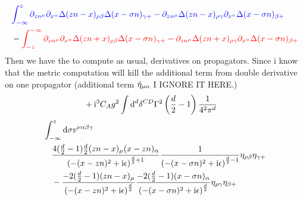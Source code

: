 \begin{align}
	&{\color{blue}\int_{-\infty}^{z}\partial_{zn^\mu} \partial_{x^\alpha} \Delta(zn-x)_{\rho \beta} \Delta(x-\sigma n)_{\gamma +} - \partial_{zn^\mu}\Delta(zn-x)_{\rho \gamma}\partial_{x^\alpha}  \Delta(x-\sigma n)_{\beta +}}
	\\
	&-{\color{red}\int_{-z}^{-\infty}\partial_{zn^\mu} \partial_{x^\alpha} \Delta(zn+x)_{\rho \beta} \Delta(x-\sigma n)_{\gamma +} - \partial_{zn^\mu}\Delta(zn+x)_{\rho \gamma}\partial_{x^\alpha}  \Delta(x-\sigma n)_{\beta +}}
\end{align}
Then we have the to compute as usual, derivatives on propagators. Since i know that the metric computation will kill the additional term from double derivative on one propagator (additional term $\tilde {\eta}_{\mu \alpha}$ I IGNORE IT HERE.)
\begin{align}
	&+\text{i}^3 C_A g^2 \int \text{d} ^d \delta^{CD}\Gamma^2\left(\frac{d}{2}-1\right)\frac{1}{4^2\pi^d}
\end{align}
{\color{blue}
\begin{align}
	&\int_{-\infty}^{z}\text{d} \sigma v^{\nu \alpha\beta\gamma}
	\\&~~~
	\frac{4(\frac{d}{2}-1)\frac{d}{2}(zn-x)_\mu(x-zn)_\alpha}{\left(-(x-zn)^2 + \text{i} \epsilon\right)^{\frac{d}{2}+1}} 
	\frac{1}{\left(-(x-\sigma n)^2 + \text{i} \epsilon\right)^{\frac{d}{2}-1}}\eta_{\rho \beta} \eta_{\gamma +} 
	\\&~~~
	- \frac{-2(\frac{d}{2}-1)(zn-x)_\mu}{\left( -(x-z n)^2 + \text{i} \epsilon \right)^{\frac{d}{2}}}\frac{-2(\frac{d}{2}-1)(x-\sigma n)_\alpha}{\left(-(x-\sigma n)^2 + \text{i} \epsilon\right)^{\frac{d}{2}}}
	\eta_{\rho \gamma}\eta_{\beta +}
\end{align}
}


